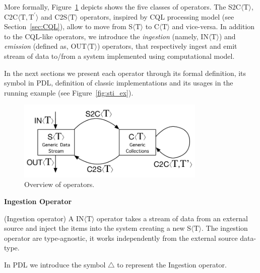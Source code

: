 More formally, Figure~\ref{fig:cm-op} depicts shows the five classes of \river{} operators. 
The S2C$\langle\mathrm{T}\rangle$, C2C$\langle\mathrm{T},\mathrm{T^{\prime}}\rangle$ and C2S$\langle\mathrm{T}\rangle$ operators, inspired by CQL processing model (see Section~\ref{sec:CQL}), allow to move from S$\langle\mathrm{T}\rangle$ to C$\langle\mathrm{T}\rangle$ and vice-versa.
In addition to the CQL-like operators, we introduce the \textit{ingestion} (namely, IN$\langle\mathrm{T}\rangle$) and \textit{emission} (defined as, OUT$\langle\mathrm{T}\rangle$) operators, that respectively ingest and emit stream of data to/from a system implemented using \river{} computational model.

In the next sections we present each operator through its formal definition, its symbol in PDL,  definition of classic implementations and its usages in the running example (see Figure~\ref{fig:sti_ex}).

\begin{figure}[t]
    \centering
    \includegraphics[width=0.8\textwidth]{img/computational-model-operators}
    \caption{Overview of \textnormal{\protect\river{}} operators.}
    \label{fig:cm-op}
\end{figure}

\medskip
\noindent
\textbf{Ingestion Operator}
\medskip

\begin{Definition}
(Ingestion operator) A IN$\langle\mathrm{T}\rangle$ operator takes a stream of data from an external source and inject the items into the system creating a new S$\langle\mathrm{T}\rangle$. 
The ingestion operator are type-agnostic, it works independently from the external source data-type.
\end{Definition}

\noindent
In PDL we introduce the symbol $\bigtriangleup$ to represent the Ingestion operator.

